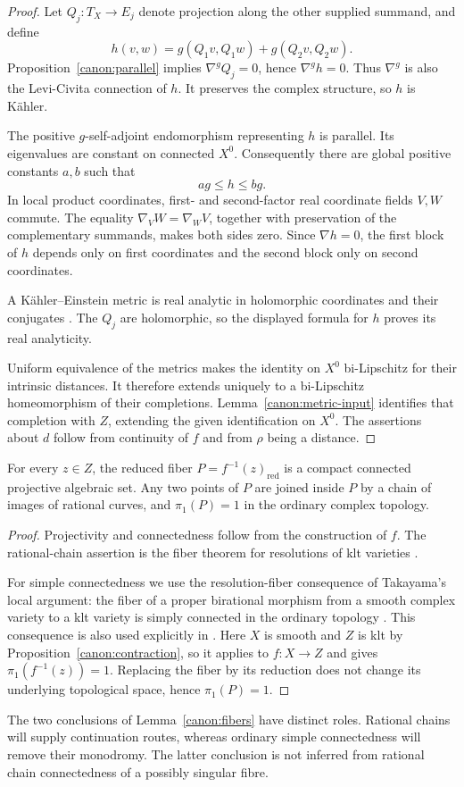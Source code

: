 \begin{proof}
Let \(Q_j:T_X\to E_j\) denote projection along the other supplied
summand, and define
\[
 h(v,w)=g(Q_1v,Q_1w)+g(Q_2v,Q_2w).
\]
Proposition~\ref{canon:parallel} implies
\(\nabla^gQ_j=0\), hence \(\nabla^gh=0\).
Thus \(\nabla^g\) is also the Levi-Civita connection of \(h\).
It preserves the complex structure, so \(h\) is Kähler.

The positive \(g\)-self-adjoint endomorphism representing \(h\)
is parallel.  Its eigenvalues are constant on connected \(X^0\).
Consequently there are global positive constants \(a,b\) such that
\[
 ag\leq h\leq bg.
\]
In local product coordinates, first- and second-factor real coordinate
fields \(V,W\) commute.  The equality
\(\nabla_VW=\nabla_WV\), together with preservation of the
complementary summands, makes both sides zero.  Since \(\nabla h=0\),
the first block of \(h\) depends only on first coordinates and the
second block only on second coordinates.

A Kähler--Einstein metric is real analytic in holomorphic coordinates
and their conjugates \cite[Theorem~6.1(c)]{DK81}.  The \(Q_j\) are
holomorphic, so the displayed formula for \(h\) proves its real
analyticity.

Uniform equivalence of the metrics makes the identity on \(X^0\)
bi-Lipschitz for their intrinsic distances.  It therefore extends
uniquely to a bi-Lipschitz homeomorphism of their completions.
Lemma~\ref{canon:metric-input} identifies that completion with \(Z\),
extending the given identification on \(X^0\).  The assertions about
\(d\) follow from continuity of \(f\) and from \(\rho\) being a
distance.
\end{proof}

\begin{lemma}\label{canon:fibers}
For every \(z\in Z\), the reduced fiber
\(P=f^{-1}(z)_{\mathrm{red}}\) is a compact connected projective
algebraic set.  Any two points of \(P\) are joined inside \(P\) by a
chain of images of rational curves, and \(\pi_1(P)=1\) in the ordinary
complex topology.
\end{lemma}

\begin{proof}
Projectivity and connectedness follow from the construction of \(f\).
The rational-chain assertion is the fiber theorem for resolutions of
klt varieties \cite[Corollary~1.6, arXiv v2]{HM07}.

For simple connectedness we use the resolution-fiber consequence of
Takayama's local argument: the fiber of a proper birational morphism
from a smooth complex variety to a klt variety is simply connected in
the ordinary topology
\cite[Theorem~1.1 and the first paragraph on p.~829]{Takayama03}.
This consequence is also used explicitly in
\cite[proof of Theorem~3.10, arXiv v4]{NS24}.
Here \(X\) is smooth and \(Z\) is klt by
Proposition~\ref{canon:contraction}, so it applies to \(f:X\to Z\)
and gives \(\pi_1(f^{-1}(z))=1\).
Replacing the fiber by its reduction does not change its underlying
topological space, hence \(\pi_1(P)=1\).
\end{proof}

The two conclusions of Lemma~\ref{canon:fibers} have distinct roles.
Rational chains will supply continuation routes, whereas ordinary simple
connectedness will remove their monodromy. The latter conclusion is not
inferred from rational chain connectedness of a possibly singular fibre.
